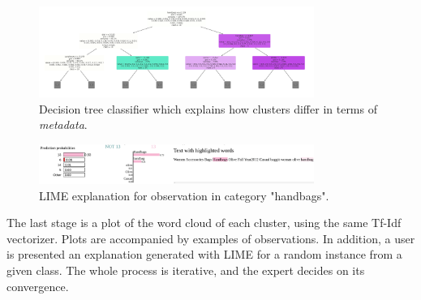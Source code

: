 \documentclass[
 twocolumn,
 hf,
]{ceurart}
\begin{document}
\begin{figure}[h!]
  \centering
  \includegraphics[width=0.8\textwidth]{tree-depth}
  \caption{Decision tree classifier which explains how clusters differ in terms of \textit{metadata}.}
  \label{fig:decision_tree}
\end{figure}

\begin{figure}[h!]
  \centering
  \includegraphics[width=0.8\textwidth]{example1-clustering-products-fashion-tex/LIME_13_handbags-Selection_265}
  \caption{LIME explanation for observation in category "handbags".}
  \label{fig:lime}
\end{figure}

The last stage is a plot of the word cloud of each cluster, using the same Tf-Idf vectorizer.
Plots are accompanied by examples of observations.%
In addition, a user is presented an explanation generated with LIME for a random instance from a given class.
The whole process is iterative, and the expert decides on its convergence.

%
\end{document}
